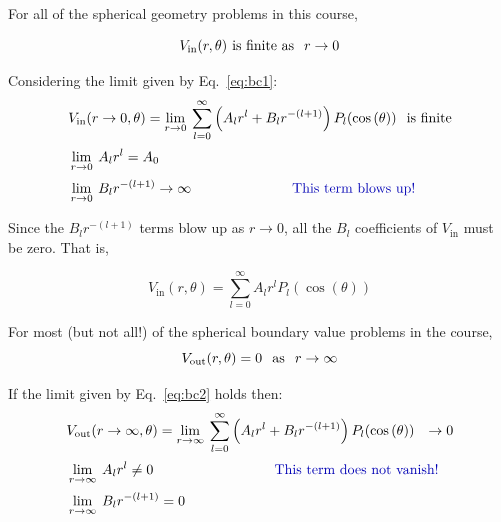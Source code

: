 \documentclass[12pt]{article}
\begin{document}
\begin{flushleft}
For all of the spherical geometry problems in this course, 

\begin{equation}
V_{\text{in}}(r,\theta)   \hspace{.05in} \text{is finite as} \hspace{.1in} r\rightarrow 0 
\label{eq:bc1}
\end{equation}

Considering the limit given by Eq.~\ref{eq:bc1}:
\begin{align}
& V_{\text{in}}(r\rightarrow 0, \theta)=\lim\limits_{r \to 0} \: \sum_{l=0}^{\infty} \left(  A_{l}r^{l} + B_{l}r^{-(l+1)} \right) P_{l}(\cos{(\theta)})  \hspace{.1in} \text{is finite} \notag \\[2pt]
& \lim\limits_{r \to 0} \: A_{l}r^{l} =A_{0} \notag \\[2pt]
& \lim\limits_{r \to 0} \: B_{l}r^{-(l+1)} \rightarrow \infty \hspace{1in} \text{\color{myblue} This term blows up!} \notag 
\end{align}

Since the $B_{l}r^{-(l+1)}$ terms blow up as $r\rightarrow 0$, all the $B_{l}$ coefficients of $V_{\text{in}}$ must be zero.  That is,

\begin{equation}
 V_{\text{in}}(r,\theta) = \sum_{l=0}^{\infty} A_{l}r^{l} P_{l}(\cos{(\theta)})
\label{eq:vin}
\end{equation}

For most (but not all!) of the spherical boundary value problems in the course, 
\begin{equation}
V_{\text{out}}(r,\theta) = 0 \hspace{.1in} \text{as} \hspace{.1in} r\rightarrow \infty 
\label{eq:bc2}
\end{equation}

If the limit given by Eq.~\ref{eq:bc2} holds then:
\begin{align}
& V_{\text{out}}(r\rightarrow \infty, \theta)=\lim\limits_{r \to \infty} \: \sum_{l=0}^{\infty} \left(  A_{l}r^{l} + B_{l}r^{-(l+1)} \right) P_{l}(\cos{(\theta)})  \hspace{.1in} \rightarrow 0 \notag \\[2pt]
& \lim\limits_{r \to \infty} \: A_{l}r^{l}  \ne 0 \hspace{1.2in} \text{\color{myblue} This term does not vanish!} \notag \\[2pt]
& \lim\limits_{r \to \infty} \: B_{l}r^{-(l+1)} = 0 \notag 
\end{align}


\end{flushleft}
\end{document}
